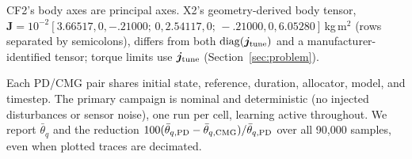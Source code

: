 \documentclass[letterpaper, 10 pt, conference]{ieeeconf}
\begin{document}

CF2's body axes are principal axes. X2's geometry-derived body tensor,
$\bm J=10^{-2}[3.66517,0,-.21000;\allowbreak\,0,2.54117,0;\allowbreak\,-.21000,0,6.05280]$\,kg\,m$^2$
(rows separated by semicolons), differs from both
$\operatorname{diag}(\bm j_{\rm tune})$ and a manufacturer-identified
tensor; torque limits use $\bm j_{\rm tune}$ (Section~\ref{sec:problem}).

Each PD/CMG pair shares initial state, reference, duration, allocator, model, and timestep. The primary campaign is nominal and deterministic (no injected disturbances or sensor noise), one run per cell, learning active throughout. We report $\bar\theta_q$ and the reduction $100(\bar\theta_{q,\rm PD}-\bar\theta_{q,\rm CMG})/\bar\theta_{q,\rm PD}$ over all 90{,}000 samples, even when plotted traces are decimated.
\end{document}
